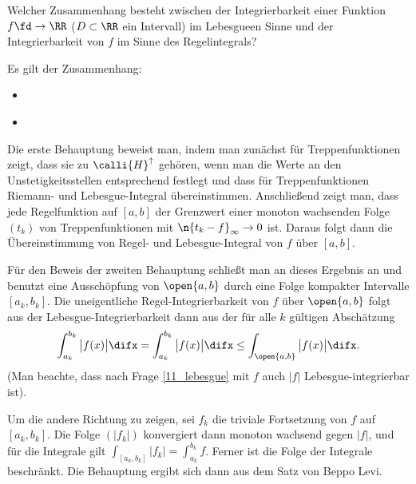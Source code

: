 \begin{frage}\label{11_riemannlebesgue}
  Welcher Zusammenhang besteht zwischen der Integrierbarkeit einer 
  Funktion $f\fd\to\RR$ ($D\subset\RR$ ein Intervall)
  im Lebesgue\sch en Sinne und der Integrierbarkeit von $f$ im 
  Sinne des Regelintegrals?
\end{frage}

\begin{antwort}
  Es gilt der Zusammenhang: 
  \setlength{\labelsep}{4mm}
  \begin{itemize}
  \item[\desc{i}]  \\[-3.5mm]
  \item[\desc{ii}] \slanted{Eine Regelfunktion $f$ auf einem offenen Intervall $]a,b[$ 
      (die Werte $a=-\infty$ und $b=\infty$ sind zugelassen) ist genau dann 
      Lebesgue-integrierbar, wenn das uneigentliche Regelintegral 
      $\int_a^b | f | \difx$ existiert. In diesem Fall stimmen die Werte des 
      uneigentlichen Regelintegrals und des Lebesgue-Integrals überein:
      \[
      \int_{]a,b[} f(x) \difx = \int_a^b f(x) \difx.
      \]
    }
  \end{itemize}
  \noindent
  Die erste Behauptung beweist man, indem man zunächst für 
  Treppenfunktionen zeigt, dass sie zu $\calli{H}^\uparrow$ gehören, 
  wenn man die Werte an den Unstetigkeitsstellen entsprechend festlegt 
  und dass für Treppenfunktionen Riemann- und Lebesgue-Integral übereinstimmen.  
  Anschließend zeigt man, dass jede Regelfunktion auf $[a,b]$ der Grenzwert 
  einer monoton wachsenden Folge $(t_k)$ von Treppenfunktionen mit 
  $\n{t_k-f}_\infty \to 0$ ist. Daraus folgt dann die Übereinstimmung 
  von Regel- und Lebesgue-Integral von $f$ über $[a,b]$. 

  Für den Beweis der zweiten Behauptung schließt man an dieses 
  Ergebnis an und benutzt eine Ausschöpfung von $\open{a,b}$ durch 
  eine Folge kompakter Intervalle $[a_k,b_k]$. Die uneigentliche 
  Regel-Integrierbarkeit von $f$ über $\open{a,b}$ 
  folgt aus der Lebesgue-Integrierbarkeit dann aus der für 
  alle $k$ gültigen Abschätzung 
  \[
  \int_{a_k}^{b_k} \big|f(x)\big| \difx = 
  \int_{a_k}^{b_k} \big|f(x)\big| \difx \le 
  \int_{\open{a,b}} \big|f(x)\big| \difx.
  \]
  (Man beachte, dass nach 
  Frage \ref{11_lebesgue} mit $f$ auch 
  $|f|$ Lebesgue-integrierbar ist). 

  Um die andere Richtung zu zeigen, sei $f_k$ die triviale Fortsetzung 
  von $f$ auf $[a_k,b_k]$. Die Folge $(|f_k|)$ konvergiert dann 
  monoton wachsend gegen $|f|$, und für die Integrale gilt  
  $\int_{[a_k,b_k]}|f_k| = \int_{a_k}^{b_k} f$. Ferner ist die Folge 
  der Integrale beschränkt. Die Behauptung ergibt sich dann aus dem Satz 
  von Beppo Levi.
  \AntEnd
\end{antwort}

